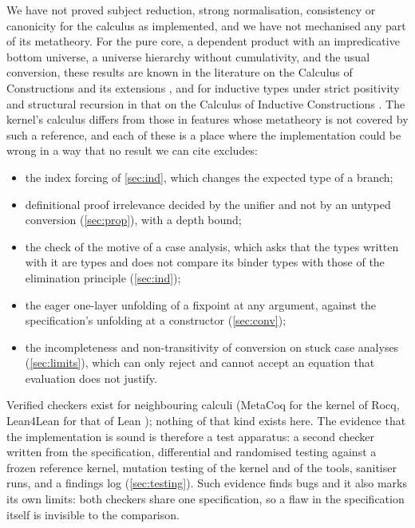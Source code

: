 We have not proved subject reduction, strong normalisation, consistency or canonicity for the calculus as implemented, and we have not mechanised any part of its metatheory.
For the pure core, a dependent product with an impredicative bottom universe, a universe hierarchy without cumulativity, and the usual conversion, these results are known in the literature on the Calculus of Constructions and its extensions \citep{coquand88cc,coquand90meta,barendregt92}, and for inductive types under strict positivity and structural recursion in that on the Calculus of Inductive Constructions \citep{coquand90ind,paulin93,gimenez94}.
The kernel's calculus differs from those in features whose metatheory is not covered by such a reference, and each of these is a place where the implementation could be wrong in a way that no result we can cite excludes:
\begin{itemize}
\item the index forcing of \cref{sec:ind}, which changes the expected type of a branch;
\item definitional proof irrelevance decided by the unifier and not by an untyped conversion (\cref{sec:prop}), with a depth bound;
\item the check of the motive of a case analysis, which asks that the types written with it are types and does not compare its binder types with those of the elimination principle (\cref{sec:ind});
\item the eager one-layer unfolding of a fixpoint at any argument, against the specification's unfolding at a constructor (\cref{sec:conv});
\item the incompleteness and non-transitivity of conversion on stuck case analyses (\cref{sec:limits}), which can only reject and cannot accept an equation that evaluation does not justify.
\end{itemize}
Verified checkers exist for neighbouring calculi (MetaCoq for the kernel of Rocq, Lean4Lean for that of Lean \citep{sozeau20,carneiro24}); nothing of that kind exists here.
The evidence that the implementation is sound is therefore a test apparatus: a second checker written from the specification, differential and randomised testing against a frozen reference kernel, mutation testing of the kernel and of the tools, sanitiser runs, and a findings log (\cref{sec:testing}).
Such evidence finds bugs and it also marks its own limits: both checkers share one specification, so a flaw in the specification itself is invisible to the comparison.
